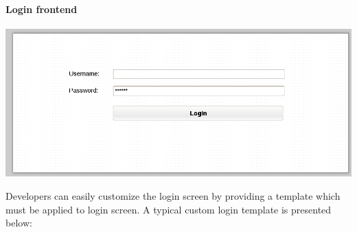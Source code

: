 \documentclass[letterpaper,10pt,english]{sphinxmanual}
\begin{document}
\paragraph{Login frontend}
\label{features/oauth2/idp:login-frontend}
\includegraphics{idp_login.png}

Developers can easily customize the login screen by providing a template which must be applied to login screen. A typical custom
login template is presented below:
\end{document}
